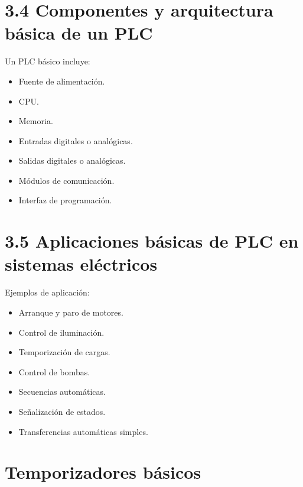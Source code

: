 \documentclass[
  spanish,
  letterpaper,
  DIV=11,
  numbers=noendperiod]{scrreprt}
\providecommand{\tightlist}{%
  \setlength{\itemsep}{0pt}\setlength{\parskip}{0pt}}
\begin{document}
\section{3.4 Componentes y arquitectura básica de un
PLC}\label{componentes-y-arquitectura-buxe1sica-de-un-plc}

Un PLC básico incluye:

\begin{itemize}
\tightlist
\item
  Fuente de alimentación.
\item
  CPU.
\item
  Memoria.
\item
  Entradas digitales o analógicas.
\item
  Salidas digitales o analógicas.
\item
  Módulos de comunicación.
\item
  Interfaz de programación.
\end{itemize}

\section{3.5 Aplicaciones básicas de PLC en sistemas
eléctricos}\label{aplicaciones-buxe1sicas-de-plc-en-sistemas-eluxe9ctricos}

Ejemplos de aplicación:

\begin{itemize}
\tightlist
\item
  Arranque y paro de motores.
\item
  Control de iluminación.
\item
  Temporización de cargas.
\item
  Control de bombas.
\item
  Secuencias automáticas.
\item
  Señalización de estados.
\item
  Transferencias automáticas simples.
\end{itemize}

\section{Temporizadores básicos}\label{temporizadores-buxe1sicos}
\end{document}
